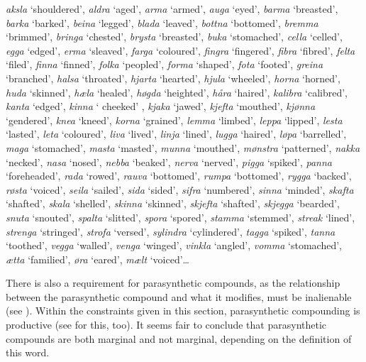 \documentclass[output=paper]{LSP/langsci}
\begin{document}
\textit{aksla} ‘shouldered’, \textit{aldra} ‘aged’, \textit{arma} ‘armed’, \textit{auga} ‘eyed’, \textit{barma} ‘breasted’, \textit{barka} ‘barked’, \textit{beina} ‘legged’, \textit{blada} ‘leaved’, \textit{bottna} ‘bottomed’, \textit{bremma} ‘brimmed’, \textit{bringa} ‘chested’, \textit{brysta} ‘breasted’, \textit{buka} ‘stomached’, \textit{cella} ‘celled’, \textit{egga} ‘edged’, \textit{erma} ‘sleaved’, \textit{farga} ‘coloured’, \textit{fingra} ‘fingered’, \textit{fibra} ‘fibred’, \textit{felta} ‘filed’, \textit{finna} ‘finned’, \textit{folka} ‘peopled’,  \textit{forma} ‘shaped’, \textit{fota} ‘footed’, \textit{greina} ‘branched’, \textit{halsa} ‘throated’, \textit{hjarta} ‘hearted’, \textit{hjula} ‘wheeled’, \textit{horna} ‘horned’, \textit{huda} ‘skinned’, \textit{hæla}  ‘healed’, \textit{høgda} ‘heighted’, \textit{håra} ‘haired’, \textit{kalibra} ‘calibred’, \textit{kanta} ‘edged’, \textit{kinna} ‘ cheeked’ , \textit{kjaka} ‘jawed’, \textit{kjefta} ‘mouthed’, \textit{kjønna} ‘gendered’, \textit{knea} ‘kneed’, \textit{korna} ‘grained’, \textit{lemma} ‘limbed’, \textit{leppa} ‘lipped’,  \textit{lesta} ‘lasted’, \textit{leta} ‘coloured’, \textit{liva} ‘lived’, \textit{linja} ‘lined’, \textit{lugga} ‘haired’, \textit{løpa} ‘barrelled’, \textit{maga} ‘stomached’, \textit{masta} ‘masted’, \textit{munna} ‘mouthed’, \textit{mønstra} ‘patterned’, \textit{nakka} ‘necked’, \textit{nasa} ‘nosed’, \textit{nebba} ‘beaked’, \textit{nerva} ‘nerved’, \textit{pigga} ‘spiked’, \textit{panna} ‘foreheaded’, \textit{rada} ‘rowed’, \textit{rauva} ‘bottomed’, \textit{rumpa} ‘bottomed’,  \textit{rygga} ‘backed’,  \textit{røsta} ‘voiced’, \textit{seila} ‘sailed’, \textit{sida} ‘sided’, \textit{sifra} ‘numbered’, \textit{sinna} ‘minded’, \textit{skafta} ‘shafted’, \textit{skala} ‘shelled’, \textit{skinna} ‘skinned’, \textit{skjefta} ‘shafted’, \textit{skjegga} ‘bearded’, \textit{snuta} ‘snouted’, \textit{spalta} ‘slitted’, \textit{spora} ‘spored’, \textit{stamma} ‘stemmed’, \textit{streak} ‘lined’, \textit{strenga} ‘stringed’, \textit{strofa} ‘versed’, \textit{sylindra} ‘cylindered’, \textit{tagga} ‘spiked’, \textit{tanna} ‘toothed’, \textit{vegga} ‘walled’,  \textit{venga} ‘winged’, \textit{vinkla} ‘angled’, \textit{vomma} ‘stomached’, \textit{ætta} ‘familied’, \textit{øra} ‘eared’, \textit{mælt} ‘voiced’… 
\z

There is also a  requirement for parasynthetic compounds, as the relationship between the parasynthetic compound and what it modifies, must be inalienable (see ).  Within the constraints given in this section, parasynthetic compounding is productive (see  for this, too). It seems fair to conclude that parasynthetic compounds are both marginal and not marginal, depending on the definition of this word. 
\end{document}
